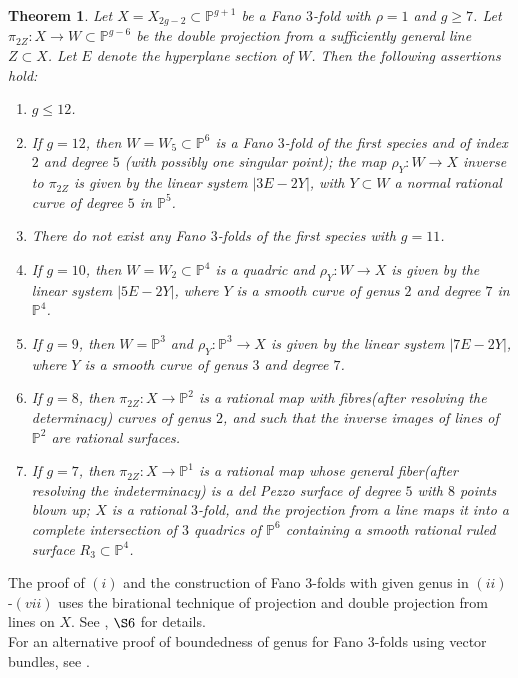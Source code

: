 \documentclass[11pt]{amsart}
\theoremstyle{plain}
\newtheorem{theorem}{Theorem}[section]
\theoremstyle{definition}
\theoremstyle{expl}
\begin{document}
\begin{theorem}
    Let $X = X_{2g-2} \subset \mathbb{P}^{g+1}$ be a Fano $3$-fold with $\rho =1$ and $g\geq 7$. %
    Let $\pi_{2Z}: X \to W \subset \mathbb{P}^{g-6}$ be the double projection from a sufficiently general line $Z \subset X$. Let $E$ denote the hyperplane section of $W$. Then the following assertions hold:
    \begin{enumerate}
        \item[(i)] $g \leq 12$. 
        \item[(ii)] If $g=12$, then $W=W_5 \subset \mathbb{P}^6$ is a Fano $3$-fold of the first species and of index $2$ and degree $5$ (with possibly one singular point); the map $\rho_Y :W \to X$ inverse to $\pi_{2Z}$ is given by the linear system $|3E-2Y|$, with $Y \subset W$ a normal rational curve of degree $5$ in $\mathbb{P}^5$.
        \item[(iii)] There do not exist any Fano $3$-folds of the first species with $g=11$. 
        \item[(iv)] If $g=10$, then $W= W_2 \subset \mathbb{P}^4$ is a quadric and $\rho_Y : W \to X$ is given by the linear system $|5E-2Y|$, where $Y$ is a smooth curve of genus $2$ and degree $7$ in $\mathbb{P}^4$.
        \item[(v)] If $g=9$, then $W= \mathbb{P}^3$ and $\rho_Y : \mathbb{P}^3 \to X$ is given by the linear system $|7E-2Y|$, where $Y$ is a smooth curve of genus $3$ and degree $7$.
        \item[(vi)] If $g=8$, then $\pi_{2Z}: X \to \mathbb{P}^2$ is a rational map with fibres(after resolving the determinacy) curves of genus $2$, and such that the inverse images of lines of $\mathbb{P}^2$ are rational surfaces.
        \item[(vii)] If $g=7$, then $\pi_{2Z}: X \to \mathbb{P}^1$ is a rational map whose general fiber(after resolving the indeterminacy) is a del Pezzo surface of degree $5$ with $8$ points blown up; $X$ is a rational $3$-fold, and the projection from a line maps it into a complete intersection of $3$ quadrics of $\mathbb{P}^6$ containing a smooth rational ruled surface $R_3 \subset \mathbb{P}^4$.
        \end{enumerate}
\end{theorem}
The proof of $(i)$ and the construction of Fano $3$-folds with given genus in $(ii)$-$(vii)$ uses the birational technique of projection and double projection from lines on $X$. See \cite{Isk78}, $\S 6$ for details.\\
For an alternative proof of boundedness of genus for Fano $3$-folds using vector bundles, see \cite{Muk92}.
	    
\end{document}
